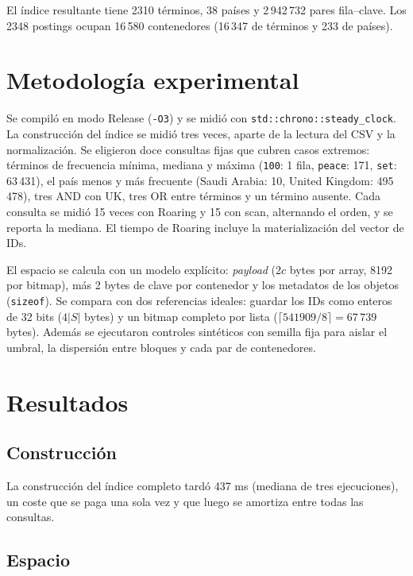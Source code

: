 \documentclass[11pt,a4paper]{article}
\begin{document}
El índice resultante tiene 2310 términos, 38 países y 2\,942\,732 pares fila--clave. Los 2348 postings ocupan 16\,580 contenedores (16\,347 de términos y 233 de países).

\section{Metodología experimental}
Se compiló en modo Release (\texttt{-O3}) y se midió con \texttt{std::chrono::steady\_clock}. La construcción del índice se midió tres veces, aparte de la lectura del CSV y la normalización. Se eligieron doce consultas fijas que cubren casos extremos: términos de frecuencia mínima, mediana y máxima (\texttt{100}: 1 fila, \texttt{peace}: 171, \texttt{set}: 63\,431), el país menos y más frecuente (Saudi Arabia: 10, United Kingdom: 495\,478), tres AND con UK, tres OR entre términos y un término ausente. Cada consulta se midió 15 veces con Roaring y 15 con scan, alternando el orden, y se reporta la mediana. El tiempo de Roaring incluye la materialización del vector de IDs.

El espacio se calcula con un modelo explícito: \emph{payload} ($2c$ bytes por array, 8192 por bitmap), más 2 bytes de clave por contenedor y los metadatos de los objetos (\texttt{sizeof}). Se compara con dos referencias ideales: guardar los IDs como enteros de 32 bits ($4|S|$ bytes) y un bitmap completo por lista ($\lceil541909/8\rceil=67\,739$ bytes). Además se ejecutaron controles sintéticos con semilla fija para aislar el umbral, la dispersión entre bloques y cada par de contenedores.

\section{Resultados}
\subsection{Construcción}
La construcción del índice completo tardó 437 ms (mediana de tres ejecuciones), un coste que se paga una sola vez y que luego se amortiza entre todas las consultas.

\subsection{Espacio}\label{sec:espacio}
\begin{table}[htbp]
\centering\small

\caption{Bytes de los postings por tipo de clave. Usado = payload + claves + metadatos; Capacidad incluye las reservas de los vectores.}\label{tab:espacio}
\end{table}
\end{document}
